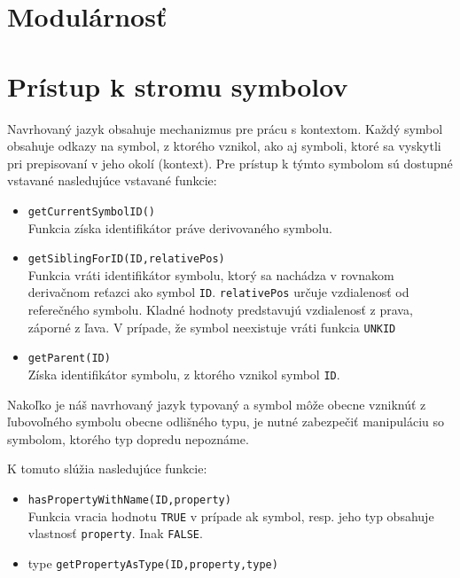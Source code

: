 \section{Modulárnosť}
\section{Prístup k stromu symbolov}

Navrhovaný jazyk obsahuje mechanizmus pre prácu s kontextom. Každý symbol obsahuje odkazy na symbol, z ktorého vznikol, ako aj symboli, ktoré sa vyskytli
pri prepisovaní v jeho okolí (kontext). Pre prístup k týmto symbolom sú dostupné vstavané nasledujúce vstavané funkcie:

\begin{itemize}
\item \texttt{getCurrentSymbolID()} \\
	Funkcia získa identifikátor práve derivovaného symbolu.
\item \texttt{getSiblingForID(ID,relativePos)} \\
	Funkcia vráti identifikátor symbolu, ktorý sa nachádza v rovnakom derivačnom reťazci ako symbol \texttt{ID}. \texttt{relativePos} určuje vzdialenosť
	od referečného symbolu. Kladné hodnoty predstavujú vzdialenosť z prava, záporné z ľava. 
	V prípade, že symbol neexistuje vráti funkcia \texttt{UNKID}
\item \texttt{getParent(ID)} \\
	Získa identifikátor symbolu, z ktorého vznikol symbol \texttt{ID}.
\end{itemize}

Nakoľko je náš navrhovaný jazyk typovaný a symbol môže obecne vzniknúť z ľubovoľného symbolu obecne odlišného typu, je nutné zabezpečiť manipuláciu so
symbolom, ktorého typ dopredu nepoznáme.

K tomuto slúžia nasledujúce funkcie:
\begin{itemize}
\item \texttt{hasPropertyWithName(ID,property)} \\
	Funkcia vracia hodnotu \texttt{TRUE} v prípade ak symbol, resp. jeho typ obsahuje vlastnosť \texttt{property}. Inak \texttt{FALSE}.
\item type \texttt{getPropertyAsType(ID,property,type)}

\end{itemize}


